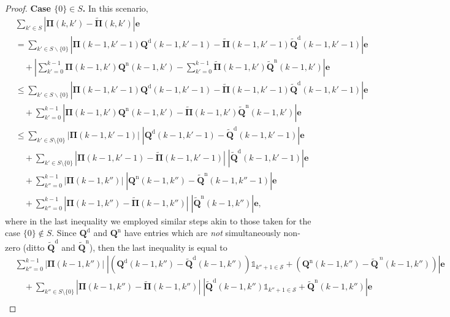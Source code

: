\documentclass[10pt,a4paper]{amsart}
\newcommand{\tld}[1]{\widetilde{#1}}
\begin{document}
\begin{proof}
\textbf{Case $\{0\}\in S$.} In this scenario,
\begin{align*}
&\sum_{k'\in S} \left|{\bm{\Pi}}(k,k')-\tld{\bm{\Pi}}(k,k')\right|\bm{e}\\
&=\sum_{k'\in S\backslash\{0\}}  \left|{\bm{\Pi}}(k-1,k'-1){\bm{Q}}^{\mathrm{d}}(k-1,k'-1) -  \tld{\bm{\Pi}}(k-1,k'-1)\tld{\bm{Q}}^{\mathrm{d}}(k-1,k'-1)\right|\bm{e}\\
&\quad + \left|\sum_{k'=0}^{k-1}  {\bm{\Pi}}(k-1,k'){\bm{Q}}^{\mathrm{n}}(k-1,k')-\sum_{k'=0}^{k-1}  \tld{\bm{\Pi}}(k-1,k')\tld{\bm{Q}}^{\mathrm{n}}(k-1,k')\right|\bm{e}\\
&\le\sum_{k'\in S\backslash\{0\}}  \left|{\bm{\Pi}}(k-1,k'-1){\bm{Q}}^{\mathrm{d}}(k-1,k'-1) -  \tld{\bm{\Pi}}(k-1,k'-1)\tld{\bm{Q}}^{\mathrm{d}}(k-1,k'-1)\right|\bm{e}\\
&\quad + \sum_{k'=0}^{k-1} \left|  {\bm{\Pi}}(k-1,k'){\bm{Q}}^{\mathrm{n}}(k-1,k')-\tld{\bm{\Pi}}(k-1,k')\tld{\bm{Q}}^{\mathrm{n}}(k-1,k')\right|\bm{e}\\
&\le\sum_{k'\in S\setminus\{0\}}\left|  {\bm{\Pi}}(k-1,k'-1)\right|\;\left| {\bm{Q}}^{\mathrm{d}}(k-1,k'-1)-\tld{\bm{Q}}^{\mathrm{d}}(k-1,k'-1)\right|\bm{e}\\
&\quad + \sum_{k'\in S\setminus\{0\}}\left| {\bm{\Pi}}(k-1,k'-1)-\tld{\bm{\Pi}}(k-1,k'-1)\right|\;\left|\tld{\bm{Q}}^{\mathrm{d}}(k-1,k'-1)\right|\bm{e}\\
&\quad+\sum_{k''=0}^{k-1}\left|  {\bm{\Pi}}(k-1,k'')\right|\;\left| {\bm{Q}}^{\mathrm{n}}(k-1,k'')-\tld{\bm{Q}}^{\mathrm{n}}(k-1,k''-1)\right|\bm{e}\\
&\quad + \sum_{k''=0}^{k-1}\left| {\bm{\Pi}}(k-1,k'')-\tld{\bm{\Pi}}(k-1,k'')\right|\;\left|\tld{\bm{Q}}^{\mathrm{n}}(k-1,k'')\right|\bm{e},
\end{align*}
where in the last inequality we employed similar steps akin to those taken for the case $\{0\}\notin S$. Since ${\bm{Q}}^{\mathrm{d}}$ and ${\bm{Q}}^{\mathrm{n}}$ have entries which are \emph{not} simultaneously non-zero (ditto $\tld{\bm{Q}}^{\mathrm{d}}$ and $\tld{\bm{Q}}^{\mathrm{n}}$), then the last inequality is equal to
\begin{align}
&\sum_{k''=0}^{k-1}\left|  {\bm{\Pi}}(k-1,k'')\right|\;\left| \left({\bm{Q}}^{\mathrm{d}}(k-1,k'')-\tld{\bm{Q}}^{\mathrm{d}}(k-1,k'')\right)\mathds{1}_{k''+1\in \mathcal{S}} + \left({\bm{Q}}^{\mathrm{n}}(k-1,k'')-\tld{\bm{Q}}^{\ {n}}(k-1,k'')\right)\right|\bm{e}\nonumber\\
&\quad + \sum_{k''\in S\setminus\{0\}}\left| {\bm{\Pi}}(k-1,k'')-\tld{\bm{\Pi}}(k-1,k'')\right|\;\left|\tld{\bm{Q}}^{\mathrm{d}}(k-1,k'')\mathds{1}_{k''+1\in \mathcal{S}} + \tld{\bm{Q}}^{\mathrm{n}}(k-1,k'')\right|\bm{e}\nonumber\\

\end{align}
\end{proof}
\end{document}
